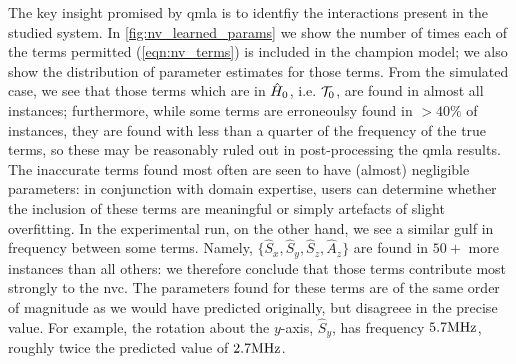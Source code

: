 The key insight promised by \gls{qmla} is to identfiy the interactions present in the studied system. 
In \cref{fig:nv_learned_params} we show the number of times each of the terms permitted (\cref{eqn:nv_terms})
    is included in the \gls{champion model}; 
    we also show the distribution of parameter estimates for those terms. 
From the simulated case, we see that those terms which are in $\hat{H}_0$, i.e. $\mathcal{T}_0$, are found in almost all instances; 
    furthermore, while some terms are erroneoulsy found in $>40\%$ of instances, 
    they are found with less than a quarter of the frequency of the true terms,
    so these may be reasonably ruled out in post-processing the \gls{qmla} results. 
The inaccurate terms found most often are seen to have (almost) negligible parameters:
    in conjunction with domain expertise, users can determine whether the inclusion of these terms 
    are meaningful or simply artefacts of slight overfitting.
In the experimental \gls{run}, on the other hand, we see a similar gulf in frequency between some terms.
Namely, $\{ \hat{S}_x, \hat{S}_y, \hat{S}_z, \hat{A}_z \}$ are found in $50+$ more \glspl{instance} than all others:
    we therefore conclude that those terms contribute most strongly to the \gls{nvc}.
The parameters found for these terms are of the same order of magnitude as we would have predicted originally, 
    but disagreee in the precise value. 
For example, the rotation about the $y$-axis, $\hat{S}_y$, has frequency $5.7\textrm{MHz}$, 
    roughly twice the predicted value of $2.7\textrm{MHz}$. 